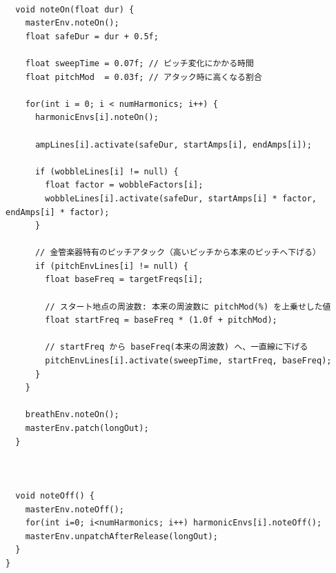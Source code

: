 \begin{lstlisting}[caption={Trumpet.pde}, label={lst:proc_trumpet}]
  
  void noteOn(float dur) {
    masterEnv.noteOn();
    float safeDur = dur + 0.5f;
    
    float sweepTime = 0.07f; // ピッチ変化にかかる時間
    float pitchMod  = 0.03f; // アタック時に高くなる割合
    
    for(int i = 0; i < numHarmonics; i++) {
      harmonicEnvs[i].noteOn();
      
      ampLines[i].activate(safeDur, startAmps[i], endAmps[i]);
      
      if (wobbleLines[i] != null) {
        float factor = wobbleFactors[i];
        wobbleLines[i].activate(safeDur, startAmps[i] * factor, endAmps[i] * factor);
      }
      
      // 金管楽器特有のピッチアタック（高いピッチから本来のピッチへ下げる）
      if (pitchEnvLines[i] != null) {
        float baseFreq = targetFreqs[i];
        
        // スタート地点の周波数: 本来の周波数に pitchMod(%) を上乗せした値
        float startFreq = baseFreq * (1.0f + pitchMod);
        
        // startFreq から baseFreq(本来の周波数) へ、一直線に下げる
        pitchEnvLines[i].activate(sweepTime, startFreq, baseFreq);
      }
    }
    
    breathEnv.noteOn();
    masterEnv.patch(longOut); 
  }
  
  
  
  void noteOff() {
    masterEnv.noteOff();
    for(int i=0; i<numHarmonics; i++) harmonicEnvs[i].noteOff();
    masterEnv.unpatchAfterRelease(longOut); 
  }
}
\end{lstlisting}

